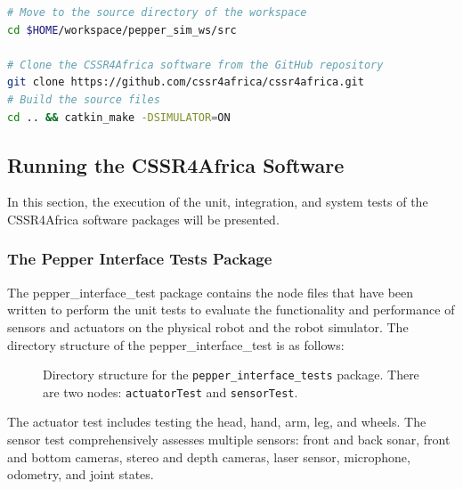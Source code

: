 \documentclass{CSSRforAfrica}
\begin{document}
{\begin{lstlisting}[style=withoutNumbering, language=bash]
# Move to the source directory of the workspace
cd $HOME/workspace/pepper_sim_ws/src

# Clone the CSSR4Africa software from the GitHub repository
git clone https://github.com/cssr4africa/cssr4africa.git
# Build the source files
cd .. && catkin_make -DSIMULATOR=ON
\end{lstlisting}

\subsection{Running the CSSR4Africa Software}
In this section, the execution of the unit, integration, and system tests of the CSSR4Africa software packages will be presented.

\subsubsection{The Pepper Interface Tests Package}
The pepper\_interface\_test package contains the node files that have been written to perform the unit tests to evaluate the functionality and performance of sensors and actuators on the physical robot and the robot simulator. The directory structure of the pepper\_interface\_test is as follows:

\begin{figure}[ht]
\label{fig:pepper-interface-tests-directory-structure}
{}
\caption{Directory structure for the \texttt{pepper\_interface\_tests} package. There are two nodes: \texttt{actuatorTest} and \texttt{sensorTest}.}
\end{figure}

The actuator test includes testing the head, hand, arm, leg, and wheels. The sensor test comprehensively assesses multiple sensors: front and back sonar, front and bottom cameras, stereo and depth cameras, laser sensor, microphone, odometry, and joint states.

}
\end{document}

